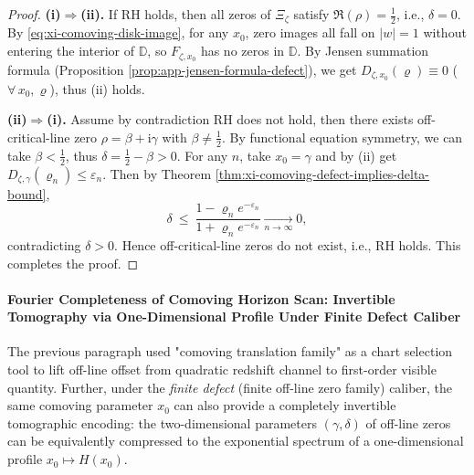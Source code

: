 \begin{proof}
\textbf{(i)\(\Rightarrow\)(ii).}
If RH holds, then all zeros of \(\Xi_{\zeta}\) satisfy \(\Re(\rho)=\tfrac12\), i.e., \(\delta=0\).
By \eqref{eq:xi-comoving-disk-image}, for any \(x_0\), zero images all fall on \(|w|=1\) without entering the interior of \(\mathbb{D}\), so \(F_{\zeta,x_0}\) has no zeros in \(\mathbb{D}\).
By Jensen summation formula (Proposition \ref{prop:app-jensen-formula-defect}), we get \(D_{\zeta,x_0}(\varrho)\equiv 0\) (\(\forall\,x_0,\varrho\)), thus (ii) holds.
\par
\textbf{(ii)\(\Rightarrow\)(i).}
Assume by contradiction RH does not hold, then there exists off-critical-line zero \(\rho=\beta+\mathrm{i}\gamma\) with \(\beta\neq\tfrac12\).
By functional equation symmetry, we can take \(\beta<\tfrac12\), thus \(\delta=\tfrac12-\beta>0\).
For any \(n\), take \(x_0=\gamma\) and by (ii) get \(D_{\zeta,\gamma}(\varrho_n)\le\varepsilon_n\).
Then by Theorem \ref{thm:xi-comoving-defect-implies-delta-bound},
\[
\delta\ \le\ \frac{1-\varrho_n e^{-\varepsilon_n}}{1+\varrho_n e^{-\varepsilon_n}}\xrightarrow[n\to\infty]{}0,
\]
contradicting \(\delta>0\).
Hence off-critical-line zeros do not exist, i.e., RH holds. This completes the proof.
\end{proof}

\paragraph{Fourier Completeness of Comoving Horizon Scan: Invertible Tomography via One-Dimensional Profile Under Finite Defect Caliber}
The previous paragraph used "comoving translation family" as a chart selection tool to lift off-line offset from quadratic redshift channel to first-order visible quantity.
Further, under the \emph{finite defect} (finite off-line zero family) caliber, the same comoving parameter \(x_0\) can also provide a completely invertible tomographic encoding: the two-dimensional parameters \((\gamma,\delta)\) of off-line zeros can be equivalently compressed to the exponential spectrum of a one-dimensional profile \(x_0\mapsto H(x_0)\).

